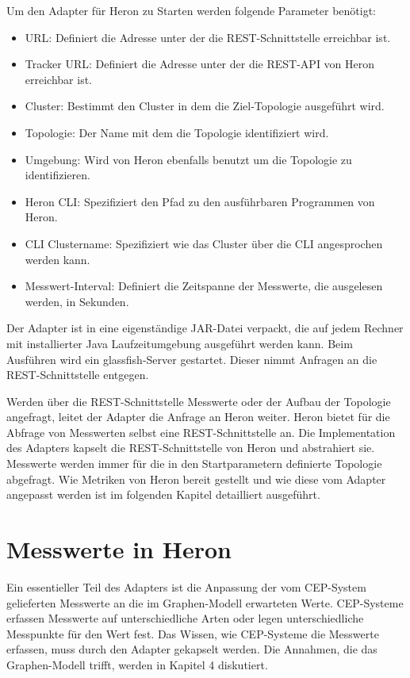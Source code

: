 Um den Adapter für Heron zu Starten werden folgende Parameter benötigt:
\begin{itemize}
\item{URL: Definiert die Adresse unter der die REST-Schnittstelle erreichbar ist.}
\item{Tracker URL: Definiert die Adresse unter der die REST-API von Heron erreichbar ist.}
\item{Cluster: Bestimmt den Cluster in dem die Ziel-Topologie ausgeführt wird.}
\item{Topologie: Der Name mit dem die Topologie identifiziert wird.}
\item{Umgebung: Wird von Heron ebenfalls benutzt um die Topologie zu identifizieren.}
\item{Heron CLI: Spezifiziert den Pfad zu den ausführbaren Programmen von Heron.}
\item{CLI Clustername: Spezifiziert wie das Cluster über die CLI angesprochen werden kann.}
\item{Messwert-Interval: Definiert die Zeitspanne der Messwerte, die ausgelesen werden, in Sekunden.}
\end{itemize}
Der Adapter ist in eine eigenständige JAR-Datei verpackt, die auf jedem Rechner mit installierter Java Laufzeitumgebung ausgeführt werden kann.
Beim Ausführen wird ein glassfish-Server gestartet.
Dieser nimmt Anfragen an die REST-Schnittstelle entgegen.

Werden über die REST-Schnittstelle Messwerte oder der Aufbau der Topologie angefragt, leitet der Adapter die Anfrage an Heron weiter.
Heron bietet für die Abfrage von Messwerten selbst eine REST-Schnittstelle an.
Die Implementation des Adapters kapselt die REST-Schnittstelle von Heron und abstrahiert sie.
Messwerte werden immer für die in den Startparametern definierte Topologie abgefragt.
Wie Metriken von Heron bereit gestellt und wie diese vom Adapter angepasst werden ist im folgenden Kapitel detailliert ausgeführt.

\section{Messwerte in Heron}

Ein essentieller Teil des Adapters ist die Anpassung der vom CEP-System gelieferten Messwerte an die im Graphen-Modell erwarteten Werte.
CEP-Systeme erfassen Messwerte auf unterschiedliche Arten oder legen unterschiedliche Messpunkte für den Wert fest.
Das Wissen, wie CEP-Systeme die Messwerte erfassen, muss durch den Adapter gekapselt werden.
Die Annahmen, die das Graphen-Modell trifft, werden in Kapitel 4 diskutiert.

